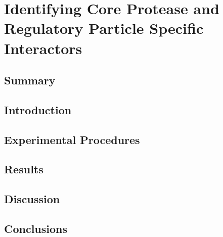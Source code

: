 \chapter{Identifying Core Protease and Regulatory Particle Specific Interactors}

\section{Summary}

\section{Introduction}

\section{Experimental Procedures}

\section{Results}

\section{Discussion}

\section{Conclusions}

